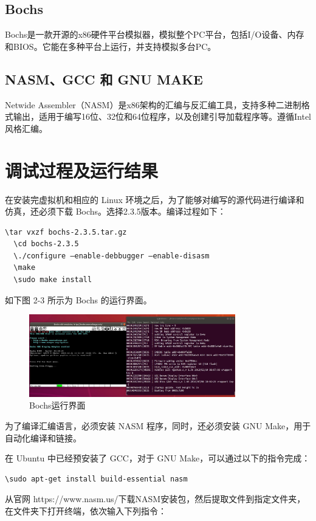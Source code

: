 \subsection{Bochs}

Bochs是一款开源的x86硬件平台模拟器，模拟整个PC平台，包括I/O设备、内存和BIOS。它能在多种平台上运行，并支持模拟多台PC。

\subsection{NASM、GCC 和 GNU MAKE}

Netwide Assembler（NASM）是x86架构的汇编与反汇编工具，支持多种二进制格式输出，适用于编写16位、32位和64位程序，以及创建引导加载程序等。遵循Intel风格汇编。


\section{调试过程及运行结果}

在安装完虚拟机和相应的 Linux 环境之后，为了能够对编写的源代码进行编译和仿真，还必须下载 Bochs。选择2.3.5版本。编译过程如下：

\begin{lstlisting}[language=bash]
  \tar vxzf bochs-2.3.5.tar.gz
  \cd bochs-2.3.5
  \./configure –enable-debbugger –enable-disasm 
  \make
  \sudo make install
\end{lstlisting}

如下图 2-3 所示为 Bochs 的运行界面。

\begin{figure}[H]
  \centering
  \includegraphics[width=0.8\textwidth]{figures/chapter2/2-3.jpg}
  \caption{Bochs运行界面}
  \label{fig:3}
\end{figure}

为了编译汇编语言，必须安装 NASM 程序，同时，还必须安装 GNU Make，用于自动化编译和链接。\par
在 Ubuntu 中已经预安装了 GCC，对于 GNU Make，可以通过以下的指令完成：
\begin{lstlisting}[language=bash]
  \sudo apt-get install build-essential nasm
\end{lstlisting}
从官网 https://www.nasm.us/下载NASM安装包，然后提取文件到指定文件夹，在文件夹下打开终端，依次输入下列指令：

